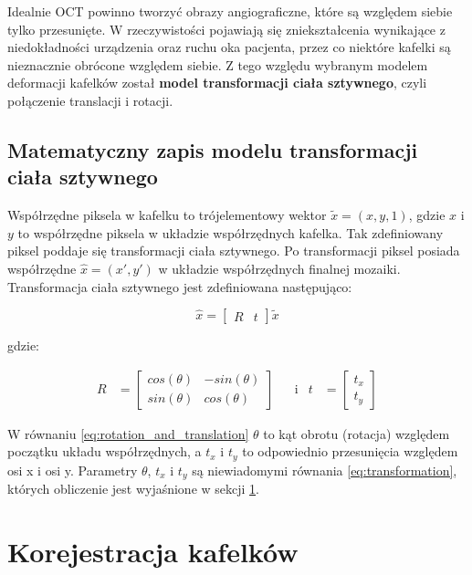 Idealnie OCT powinno tworzyć obrazy angiograficzne, które są względem siebie tylko przesunięte. W rzeczywistości pojawiają się zniekształcenia wynikające z niedokładności urządzenia oraz ruchu oka pacjenta, przez co niektóre kafelki są nieznacznie obrócone względem siebie. Z tego względu wybranym modelem deformacji kafelków został \textbf{model transformacji ciała sztywnego}, czyli połączenie translacji i rotacji.

\subsection{Matematyczny zapis modelu transformacji ciała sztywnego}

Współrzędne piksela w kafelku to trójelementowy wektor $\widetilde{x}=(x, y, 1)$, gdzie $x$ i $y$ to współrzędne piksela w układzie współrzędnych kafelka. Tak zdefiniowany piksel poddaje się transformacji ciała sztywnego. Po transformacji piksel posiada współrzędne $\hat{x}=(x', y')$ w układzie współrzędnych finalnej mozaiki. Transformacja ciała sztywnego jest zdefiniowana następująco:

\begin{equation}
\hat{x}=\begin{bmatrix}R&t\end{bmatrix}\widetilde{x}
\label{eq:transformation}
\end{equation}

gdzie:

\begin{align}
R &= \begin{bmatrix}cos(\theta)&-sin(\theta)\\sin(\theta)&cos(\theta)\end{bmatrix} &&\text{i} & t &= \begin{bmatrix}t_{x}\\t_{y}\end{bmatrix}
\label{eq:rotation_and_translation}
\end{align}

W równaniu \ref{eq:rotation_and_translation} $\theta$ to kąt obrotu (rotacja) względem początku układu współrzędnych, a $t_{x}$ i $t_{y}$ to odpowiednio przesunięcia względem osi x i osi y. Parametry $\theta$, $t_{x}$ i $t_{y}$ są niewiadomymi równania \ref{eq:transformation}, których obliczenie jest wyjaśnione w sekcji \ref{sec:algorytmy_korejestracji:korejestracja_kafelow}.

\section{Korejestracja kafelków}
\label{sec:algorytmy_korejestracji:korejestracja_kafelow}

